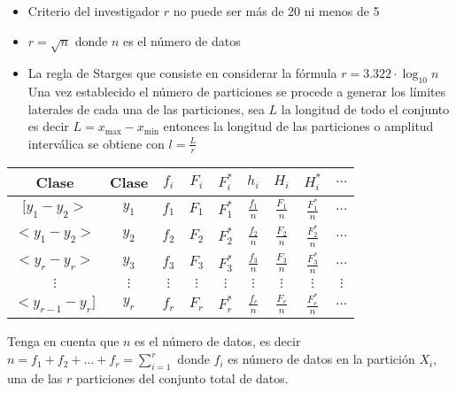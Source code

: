 \documentclass[10pt,]{krantz}
\theoremstyle{definition}
\theoremstyle{definition}
\theoremstyle{definition}
\theoremstyle{remark}
\begin{document}
\begin{itemize}
\item
  Criterio del investigador \(r\) no puede ser más de 20 ni menos de 5
\item
  \(r=\sqrt{n}\) donde \(n\) es el número de datos
\item
  La regla de Starges que consiste en considerar la fórmula \(r=3.322\cdot\log_{10} n\)
  Una vez establecido el número de particiones se procede a generar los límites laterales de cada una de las particiones, sea \(L\) la longitud de todo el conjunto es decir \(L=x_{\text{max}}-x_{\text{min}}\) entonces la longitud de las particiones o amplitud interválica se obtiene con \(l=\frac{L}{r}\)
\end{itemize}

\begin{longtable}[]{@{}ccccccccc@{}}
\toprule
Clase & Clase & \(f_i\) & \(F_i\) & \(F_i^*\) & \(h_i\) & \(H_i\) & \(H_i^*\) & \(\ldots\)\tabularnewline
\midrule
\endhead
\([y_1-y_2>\) & \(y_1\) & \(f_1\) & \(F_1\) & \(F_1^*\) & \(\frac{f_1}{n}\) & \(\frac{F_1}{n}\) & \(\frac{F_1^*}{n}\) & \(\ldots\)\tabularnewline
\(<y_1-y_2>\) & \(y_2\) & \(f_2\) & \(F_2\) & \(F_2^*\) & \(\frac{f_2}{n}\) & \(\frac{F_2}{n}\) & \(\frac{F_2^*}{n}\) & \(\ldots\)\tabularnewline
\(<y_{r}-y_r>\) & \(y_3\) & \(f_3\) & \(F_3\) & \(F_3^*\) & \(\frac{f_3}{n}\) & \(\frac{F_3}{n}\) & \(\frac{F_3^*}{n}\) & \(\ldots\)\tabularnewline
\(\vdots\) & \(\vdots\) & \(\vdots\) & \(\vdots\) & \(\vdots\) & \(\vdots\) & \(\vdots\) & \(\vdots\) & \(\vdots\)\tabularnewline
\(<y_{r-1}-y_r]\) & \(y_r\) & \(f_r\) & \(F_r\) & \(F_r^*\) & \(\frac{f_r}{n}\) & \(\frac{F_r}{n}\) & \(\frac{F_r^*}{n}\) & \(...\)\tabularnewline
\bottomrule
\end{longtable}

Tenga en cuenta que \(n\) es el número de datos, es decir \(n=f_1+f_2+\ldots+f_r=\sum_{i=1}^r\) donde \(f_i\) es número de datos en la partición \(X_i\), una de las \(r\) particiones del conjunto total de datos.
\end{document}
